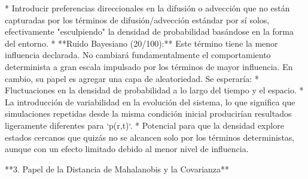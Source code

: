 \documentclass{book}
\begin{document}
    *   Introducir preferencias direccionales en la difusión o advección que no están capturadas por los términos de difusión/advección estándar por sí solos, efectivamente "esculpiendo" la densidad de probabilidad basándose en la forma del entorno.
*   **Ruido Bayesiano (20/100):** Este término tiene la menor influencia declarada. No cambiará fundamentalmente el comportamiento determinista a gran escala impulsado por los términos de mayor influencia. En cambio, su papel es agregar una capa de aleatoriedad. Se esperaría:
    *   Fluctuaciones en la densidad de probabilidad a lo largo del tiempo y el espacio.
    *   La introducción de variabilidad en la evolución del sistema, lo que significa que simulaciones repetidas desde la misma condición inicial producirían resultados ligeramente diferentes para `p(r,t)`.
    *   Potencial para que la densidad explore estados cercanos que quizás no se alcancen solo por los términos deterministas, aunque con un efecto limitado debido al menor nivel de influencia.

**3. Papel de la Distancia de Mahalanobis y la Covarianza**
\end{document}
